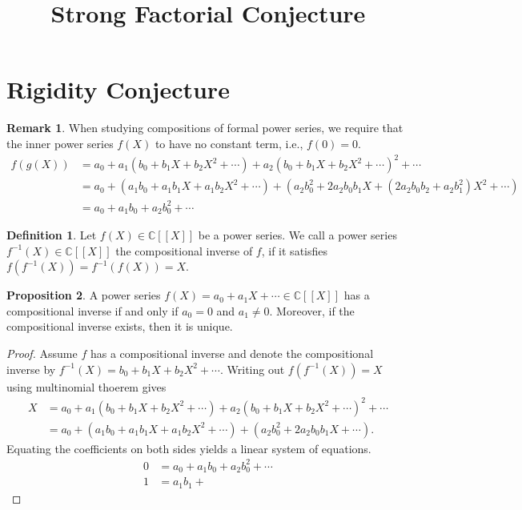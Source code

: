\documentclass[a4paper]{article}
\title{Strong Factorial Conjecture}
\theoremstyle{definition}
\newtheorem{definition}{Definition}[]
\newtheorem{proposition}[definition]{Proposition}
\newtheorem*{remark}{Remark}
\begin{document}
\section{Rigidity Conjecture}
\begin{remark}
    When studying compositions of formal power series, we require that the inner power series \(f(X)\) to have no constant term, i.e., \(f(0) = 0\).
    \begin{align*}
        f(g(X)) &= a_0 + a_1 (b_0 + b_1 X + b_2 X^2 + \cdots) + a_2 (b_0 + b_1 X + b_2 X^2 + \cdots)^2 + \cdots \\
        &= a_0 + (a_1 b_0 + a_1 b_1 X + a_1 b_2 X^2 + \cdots) + (a_2 b_0^2 + 2 a_2 b_0 b_1 X + (2 a_2 b_0 b_2 + a_2 b_1^2) X^2 + \cdots) \\
        &= a_0 + a_1 b_0 + a_2 b_0^2 + \cdots
    \end{align*}
\end{remark}
\begin{definition}
    Let \(f(X) \in \mathbb{C}[[X]]\) be a power series. We call a power series \(f^{-1}(X) \in \mathbb{C}[[X]]\) the compositional inverse of \(f\), if it satisfies \(f(f^{-1}(X)) = f^{-1}(f(X)) = X\). 
\end{definition}
\begin{proposition}
    A power series \(f(X) = a_0 + a_1 X + \cdots\in \mathbb{C}[[X]]\) has a compositional inverse if and only if \(a_0 = 0\) and \(a_1 \neq 0\). Moreover, if the compositional inverse exists, then it is unique. 
\end{proposition}
\begin{proof}
    Assume \(f\) has a compositional inverse and denote the compositional inverse by \(f^{-1}(X) = b_0 + b_1 X + b_2 X^2 + \cdots\). Writing out \(f(f^{-1}(X)) = X\) using multinomial thoerem gives
    \begin{align*}
        X &= a_0 + a_1 (b_0 + b_1 X + b_2 X^2 + \cdots) + a_2 (b_0 + b_1 X + b_2 X^2 + \cdots)^2 + \cdots \\
        &= a_0 + (a_1b_0 + a_1 b_1 X + a_1 b_2 X^2 + \cdots) + (a_2 b_0^2 + 2 a_ 2 b_0 b_1 X + \cdots) \text{.}
    \end{align*}
    Equating the coefficients on both sides yields a linear system of equations.
    \begin{align*}
        0 &= a_0 + a_1 b_0 + a _2 b_0^2 + \cdots \\
        1 &= a_1 b_1 +
    \end{align*}
\end{proof}
\end{document}
